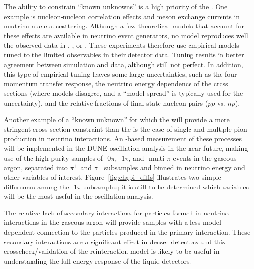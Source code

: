 \begin{itemize}
{The ability to constrain ``known unknowns'' is a high priority of the . One example is nucleon-nucleon correlation effects and meson exchange currents in neutrino-nucleus scattering.  Although a few theoretical models that account for these effects are available in neutrino event generators, no model reproduces well the observed data in , , or .  These experiments therefore use empirical models tuned to the limited observables in their detector data.  Tuning results in better agreement between simulation and data, although still not perfect. In addition, this type of empirical tuning leaves some large uncertainties, such as the four-momentum transfer response, the neutrino energy dependence of the cross sections (where models disagree, and a ``model spread'' is typically used for the uncertainty), and the relative fractions of final state nucleon pairs ($pp$ vs. $np$). 



Another example of a ``known unknown'' for which the  will provide a more stringent cross section constraint than the  is the case of single and multiple pion production in  neutrino interactions. An -based measurement of these processes will be implemented in the DUNE  oscillation analysis in the near future, making use of the high-purity samples of -$0\pi$, -$1\pi$, and -multi-$\pi$ events in the gaseous argon, separated into $\pi^+$ and $\pi^-$ subsamples and binned in neutrino energy and other variables of interest. Figure~\ref{fig:chgpi_diffs} illustrates two simple differences among the  -$1\pi$ subsamples; it is still to be determined which variables will be the most useful in the  oscillation analysis.

The relative lack of secondary interactions for particles formed in neutrino interactions in the gaseous argon  will provide samples with a less model dependent connection to the particles produced in the primary interaction.  These secondary interactions are a significant effect in denser detectors \cite{Friedland:2018vry} and this crosscheck/validation of the reinteraction model is likely to be useful in understanding the full energy response of the liquid detectors.   


}
\end{itemize}
